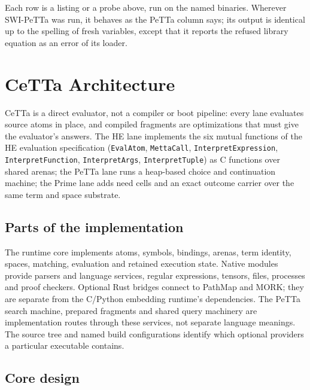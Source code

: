 \documentclass[11pt]{article}
\newcommand{\code}[1]{\texttt{#1}}
\newcommand{\PeTTa}{\textup{PeTTa}}
\newcommand{\HE}{\textup{HE}}
\newcommand{\CeTTa}{\textup{CeTTa}}
\begin{document}
\noindent
Each row is a listing or a probe above, run on the named binaries.  Wherever
SWI-\PeTTa{} was run, it behaves as the \PeTTa{} column says; its output is
identical up to the spelling of fresh variables, except that it reports the
refused library equation as an error of its loader.

\section{\CeTTa{} Architecture}
\label{sec:architecture}

\CeTTa{} is a direct evaluator, not a compiler or boot pipeline: every lane
evaluates source atoms in place, and compiled fragments are optimizations that
must give the evaluator's answers.  The \HE{} lane implements the six mutual
functions of the \HE{} evaluation specification (\code{EvalAtom},
\code{MettaCall}, \code{InterpretExpression}, \code{InterpretFunction},
\code{InterpretArgs}, \code{InterpretTuple}) as C functions over shared
arenas; the \PeTTa{} lane runs a heap-based choice and continuation machine;
the Prime lane adds need cells and an exact outcome carrier over the same term
and space substrate.

\subsection{Parts of the implementation}

The runtime core implements atoms, symbols, bindings, arenas, term identity,
spaces, matching, evaluation and retained execution state.  Native modules
provide parsers and language services, regular expressions, tensors, files,
processes and proof checkers.  Optional Rust bridges connect to PathMap and
MORK; they are separate from the C/Python embedding runtime's dependencies.
The PeTTa search machine, prepared fragments and shared query machinery are
implementation routes through these services, not separate language meanings.
The source tree and named build configurations identify which optional
providers a particular executable contains.

\subsection{Core design}
\end{document}
